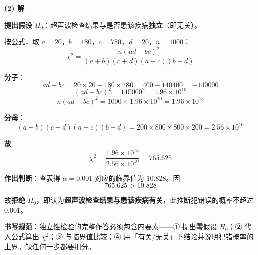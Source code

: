 \begin{answer}
\par\medskip

\textbf{(2) 解}

\textbf{提出假设} $H_0$：超声波检查结果与是否患该疾病\textbf{独立}（即无关）。

按公式，取 $a=20$，$b=180$，$c=780$，$d=20$，$n=1000$：
\nopagebreak[4]
\[\chi^2=\frac{n(ad-bc)^2}{(a+b)(c+d)(a+c)(b+d)}\]

\textbf{分子}：
\nopagebreak[4]
\[ad-bc=20\times20-180\times780=400-140400=-140000\]
\nopagebreak[4]
\[(ad-bc)^2=140000^2=1.96\times10^{10}\]
\nopagebreak[4]
\[n(ad-bc)^2=1000\times1.96\times10^{10}=1.96\times10^{13}\]

\textbf{分母}：
\nopagebreak[4]
\[(a+b)(c+d)(a+c)(b+d)=200\times800\times800\times200=2.56\times10^{10}\]

\textbf{故}
\nopagebreak[4]
\[\chi^2=\frac{1.96\times10^{13}}{2.56\times10^{10}}=765.625\]

\textbf{作出判断}：查表得 $\alpha=0.001$ 对应的临界值为 $10.828$。因
\nopagebreak[4]
\[765.625>10.828\]

故\textbf{拒绝} $H_0$，即认为\textbf{超声波检查结果与患该疾病有关}，此推断犯错误的概率不超过 $0.001$。

\begin{gktip}
\textbf{书写规范}：独立性检验的完整作答必须包含四要素——① 提出零假设 $H_0$；② 代入公式算出 $\chi^2$；③ 与临界值比较；④ 用「有关/无关」下结论并说明犯错概率的上界。缺任何一步都要扣分。
\end{gktip}



\par\medskip

\end{answer}
